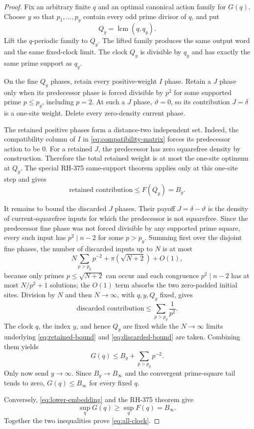 \documentclass[11pt]{article}
\theoremstyle{definition}
\theoremstyle{remark}
\newcommand{\dd}{\delta}
\newcommand{\thh}{\vartheta}
\begin{document}
\begin{proof}
Fix an arbitrary finite $q$ and an optimal canonical action family for
$G(q)$.  Choose $y$ so that $p_1,\ldots,p_y$ contain every odd prime divisor
of $q$, and put
\begin{equation}
                  Q_y=\operatorname{lcm}(q,q_y).
 \label{eq:cofinal-clock}
\end{equation}
Lift the $q$-periodic family to $Q_y$.  The lifted family produces the same
output word and the same fixed-clock limit.  The clock $Q_y$ is divisible by
$q_y$ and has exactly the same prime support as $q_y$.

On the fine $Q_y$ phases, retain every positive-weight $I$ phase.  Retain a
$J$ phase only when its predecessor phase is forced divisible by $p^2$ for
some supported prime $p\le p_y$, including $p=2$.  At such a $J$ phase,
$\thh=0$, so its contribution $J=\dd$ is a one-site weight.  Delete every
zero-density current phase.

The retained positive phases form a distance-two independent set.  Indeed,
the compatibility column of $I$ in \eqref{eq:compatibility-matrix} forces
its predecessor action to be $0$.  For a retained $J$, the predecessor has
zero squarefree density by construction.  Therefore the total retained
weight is at most the one-site optimum at $Q_y$.  The special RH-375
same-support theorem applies only at this one-site step and gives
\begin{equation}
                   \text{retained contribution}\le F(Q_y)=B_y.
 \label{eq:retained-bound}
\end{equation}

It remains to bound the discarded $J$ phases.  Their payoff
$J=\dd-\thh$ is the density of current-squarefree inputs for which the
predecessor is not squarefree.  Since the predecessor fine phase was not
forced divisible by any supported prime square, every such input has
$p^2\mid n-2$ for some $p>p_y$.  Summing first over the disjoint fine phases,
the number of discarded inputs up to $N$ is at most
\[
 N\sum_{p>p_y}p^{-2}+\pi(\sqrt{N+2})+O(1),
\]
because only primes $p\le\sqrt{N+2}$ can occur and each congruence
$p^2\mid n-2$ has at most $N/p^2+1$ solutions; the $O(1)$ term absorbs the
two zero-padded initial sites.  Division by $N$ and then
$N\to\infty$, with $q,y,Q_y$ fixed, gives
\begin{equation}
              \text{discarded contribution}
              \le\sum_{p>p_y}\frac1{p^2}.
 \label{eq:discarded-bound}
\end{equation}
The clock $q$, the index $y$, and hence $Q_y$ are fixed while the
$N\to\infty$ limits underlying \eqref{eq:retained-bound} and
\eqref{eq:discarded-bound} are taken.  Combining them yields
\[
                 G(q)\le B_y+\sum_{p>p_y}p^{-2}.
\]
Only now send $y\to\infty$.  Since $B_y\to B_\infty$ and the convergent
prime-square tail tends to zero, $G(q)\le B_\infty$ for every fixed $q$.

Conversely, \eqref{eq:lower-embedding} and the RH-375 theorem give
\[
     \sup_qG(q)\ge\sup_qF(q)=B_\infty.
\]
Together the two inequalities prove \eqref{eq:all-clock}.
\end{proof}
\end{document}
